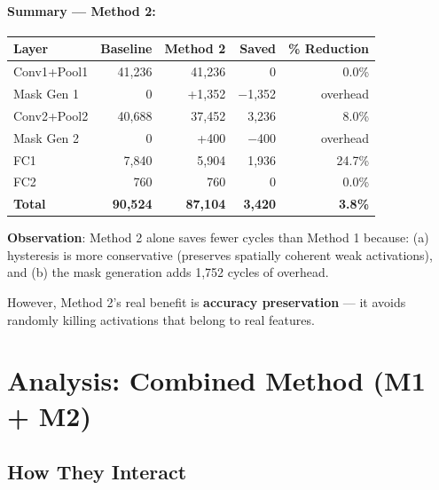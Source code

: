 \documentclass[11pt,a4paper]{article}
\begin{document}
\paragraph{Summary — Method 2:}
\begin{center}
\begin{tabular}{lrrrr}
\toprule
\textbf{Layer} & \textbf{Baseline} & \textbf{Method 2} & \textbf{Saved} & \textbf{\% Reduction} \\
\midrule
Conv1+Pool1 & 41,236 & 41,236 & 0 & 0.0\% \\
Mask Gen 1  & 0      & +1,352 & $-$1,352 & overhead \\
Conv2+Pool2 & 40,688 & 37,452 & 3,236 & 8.0\% \\
Mask Gen 2  & 0      & +400   & $-$400 & overhead \\
FC1         & 7,840  & 5,904  & 1,936 & 24.7\% \\
FC2         & 760    & 760    & 0 & 0.0\% \\
\midrule
\textbf{Total} & \textbf{90,524} & \textbf{87,104} & \textbf{3,420} & \textbf{3.8\%} \\
\bottomrule
\end{tabular}
\end{center}

\noindent\textbf{Observation}: Method 2 alone saves fewer cycles than Method 1
because: (a) hysteresis is more conservative (preserves spatially coherent
weak activations), and (b) the mask generation adds 1,752 cycles of overhead.

However, Method 2's real benefit is \textbf{accuracy preservation} — it avoids
randomly killing activations that belong to real features.

\section{Analysis: Combined Method (M1 + M2)}
\label{sec:combined}

\subsection{How They Interact}
\end{document}

